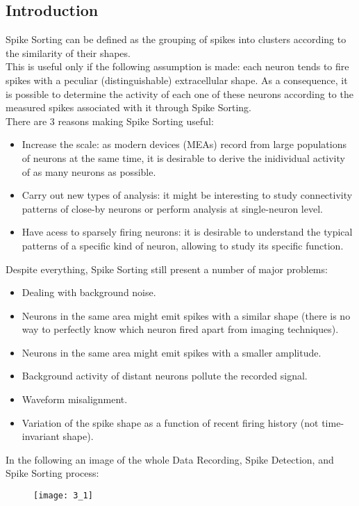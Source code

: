 \subsection{Introduction}
Spike Sorting can be defined as the grouping of spikes into clusters
according to the similarity of their shapes.\\
This is useful only if the following assumption is made: each neuron tends
to fire spikes with a peculiar (distinguishable) extracellular shape.
As a consequence, it is possible to determine the activity of each one of these
neurons according to the measured spikes associated with it through Spike Sorting.\\
There are 3 reasons making Spike Sorting useful:
\begin{itemize}
    \item Increase the scale: as modern devices (MEAs) record from large populations
    of neurons at the same time, it is desirable to derive the inidividual
    activity of as many neurons as possible.
    \item Carry out new types of analysis: it might be interesting to study
    connectivity patterns of close-by neurons or perform analysis at
    single-neuron level.
    \item Have acess to sparsely firing neurons: it is desirable to understand
    the typical patterns of a specific kind of neuron, allowing to study its
    specific function.
\end{itemize}
Despite everything, Spike Sorting still present a number of major problems:
\begin{itemize}
    \item Dealing with background noise.
    \item Neurons in the same area might emit spikes with a similar shape (there
    is no way to perfectly know which neuron fired apart from imaging techniques).
    \item Neurons in the same area might emit spikes with a smaller amplitude.
    \item Background activity of distant neurons pollute the recorded signal.
    \item Waveform misalignment.
    \item Variation of the spike shape as a function of recent firing history
    (not time-invariant shape).
\end{itemize}
In the following an image of the whole Data Recording, Spike Detection, and
Spike Sorting process:
\begin{figure}[H]
    \texttt{[image: 3\_1]}
    \centering
\end{figure}


